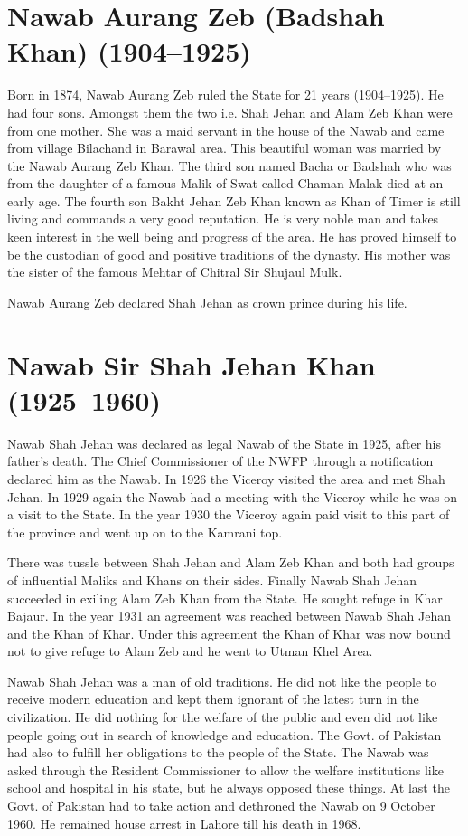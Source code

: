 \documentclass[twoside,openright]{book}
\begin{document}
\section{Nawab Aurang Zeb (Badshah Khan) (1904--1925)}

Born in 1874, Nawab Aurang Zeb ruled the State for 21 years (1904--1925). He had
four sons. Amongst them the two i.e. Shah Jehan and Alam Zeb Khan were from one
mother. She was a maid servant in the house of the Nawab and came from village
Bilachand in Barawal area. This beautiful woman was married by the Nawab Aurang
Zeb Khan. The third son named Bacha or Badshah who was from the daughter of a
famous Malik of Swat called Chaman Malak died at an early age. The fourth son
Bakht Jehan Zeb Khan known as Khan of Timer is still living and commands a very
good reputation. He is very noble man and takes keen interest in the well being
and progress of the area. He has proved himself to be the custodian of good and
positive traditions of the dynasty. His mother was the sister of the famous
Mehtar of Chitral Sir Shujaul Mulk.

Nawab Aurang Zeb declared Shah Jehan as crown prince during his life.

\section{Nawab Sir Shah Jehan Khan (1925--1960)}

Nawab Shah Jehan was declared as legal Nawab of the State in 1925, after his
father's death. The Chief Commissioner of the NWFP through a notification
declared him as the Nawab. In 1926 the Viceroy visited the area and met Shah
Jehan. In 1929 again the Nawab had a meeting with the Viceroy while he was on a
visit to the State. In the year 1930 the Viceroy again paid visit to this part
of the province and went up on to the Kamrani top.

There was tussle between Shah Jehan and Alam Zeb Khan and both had groups of
influential Maliks and Khans on their sides. Finally Nawab Shah Jehan succeeded
in exiling Alam Zeb Khan from the State. He sought refuge in Khar Bajaur. In the
year 1931 an agreement was reached between Nawab Shah Jehan and the Khan of
Khar. Under this agreement the Khan of Khar was now bound not to give refuge to
Alam Zeb and he went to Utman Khel Area.

Nawab Shah Jehan was a man of old traditions. He did not like the people to
receive modern education and kept them ignorant of the latest turn in the
civilization. He did nothing for the welfare of the public and even did not like
people going out in search of knowledge and education. The Govt. of Pakistan had
also to fulfill her obligations to the people of the State. The Nawab was asked
through the Resident Commissioner to allow the welfare institutions like school
and hospital in his state, but he always opposed these things. At last the Govt.
of Pakistan had to take action and dethroned the Nawab on 9 October 1960. He
remained house arrest in Lahore till his death in 1968.
\end{document}
